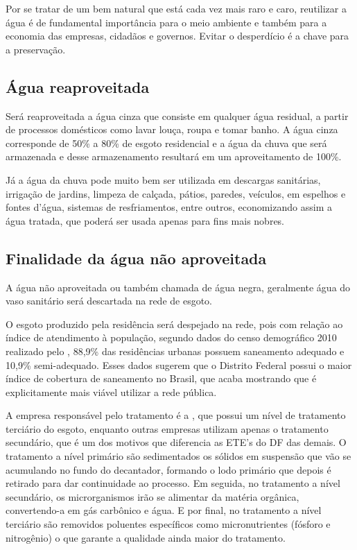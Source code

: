 	Por se tratar de um bem natural que está cada vez mais raro e caro, reutilizar a água é de fundamental importância para o meio ambiente e também para a economia das empresas, cidadãos e governos. Evitar o desperdício é a chave para a preservação.

\subsection{Água reaproveitada}

	Será reaproveitada a água cinza que consiste em qualquer água residual, a partir de processos domésticos como lavar louça, roupa e tomar banho. A água cinza corresponde de 50\% a 80\% de esgoto residencial e a água da chuva que será armazenada e desse armazenamento resultará em um aproveitamento de 100\%.

	Já a água da chuva pode muito bem ser utilizada em descargas sanitárias, irrigação de jardins, limpeza de calçada, pátios, paredes, veículos, em espelhos e fontes d’água, sistemas de resfriamentos, entre outros, economizando assim a água tratada, que poderá ser usada apenas para fins mais nobres.

\subsection{Finalidade da água não aproveitada}

	A água não aproveitada ou também chamada de água negra, geralmente água do vaso sanitário será descartada na rede de esgoto.

	O esgoto produzido pela residência será despejado na rede, pois com relação ao índice de atendimento à população, segundo dados do censo demográfico 2010 realizado pelo \cite{IBGE}, 88,9\% das residências urbanas possuem saneamento adequado e 10,9\% semi-adequado. Esses dados sugerem que o Distrito Federal possui o maior índice de cobertura de saneamento no Brasil, que acaba mostrando que é explicitamente mais viável utilizar a rede pública.

	A empresa responsável pelo tratamento é a \cite{CAESB}, que possui um nível de tratamento terciário do esgoto, enquanto outras empresas utilizam apenas o tratamento secundário, que é um dos motivos que diferencia as ETE's do DF das demais. O tratamento a nível primário são sedimentados os sólidos em suspensão que vão se acumulando no fundo do decantador, formando o lodo primário que depois é retirado para dar continuidade ao processo. Em seguida, no tratamento a nível secundário, os microrganismos irão se alimentar da matéria orgânica, convertendo-a em gás carbônico e água. E por final, no tratamento a nível terciário são removidos poluentes específicos como micronutrientes (fósforo e nitrogênio) o que garante a qualidade ainda maior do tratamento.

